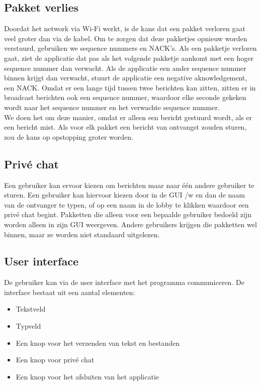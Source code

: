 \documentclass{article}
\begin{document}
\subsection{Pakket verlies}
Doordat het network via Wi-Fi werkt, is de kans dat een pakket verloren gaat veel groter dan via de kabel. Om te zorgen dat deze pakketjes opnieuw worden verstuurd, gebruiken we sequence nummers en NACK's. Als een pakketje verloren gaat, ziet de applicatie dat pas als het volgende pakketje aankomt met een hoger sequence nummer dan verwacht. Als de applicatie een ander sequence nummer binnen krijgt dan verwacht, stuurt de applicatie een negative aknowledgement, een NACK. Omdat er een lange tijd tussen twee berichten kan zitten, zitten er in broadcast berichten ook een sequence nummer, waardoor elke seconde gekeken wordt naar het sequence nummer en het verwachte sequence nummer. \\
We doen het om deze manier, omdat er alleen een bericht gestuurd wordt, als er een bericht mist. Als voor elk pakket een bericht van ontvangst zouden sturen, zou de kans op opstopping groter worden. \\

\subsection{Priv\'{e} chat}
Een gebruiker kan ervoor kiezen om berichten maar naar \'{e}\'{e}n andere gebruiker te sturen. Een gebruiker kan hiervoor kiezen door in de GUI /w en dan de naam van de ontvanger te typen, of op een naam in de lobby te klikken waardoor een priv\'{e} chat begint. Pakketten die alleen voor een bepaalde gebruiker bedoeld zijn worden alleen in zijn GUI weergeven. Andere gebruikers krijgen die pakketten wel binnen, maar ze worden niet standaard uitgelezen. \\

\subsection{User interface}
De gebruiker kan via de user interface met het programma communiceren. De interface bestaat uit een aantal elementen:
\begin{itemize}
\item Tekstveld
\item Typveld
\item Een knop voor het verzenden van tekst en bestanden
\item Een knop voor priv\'{e} chat
\item Een knop voor het afsluiten van het applicatie
\end{itemize}
\end{document}
